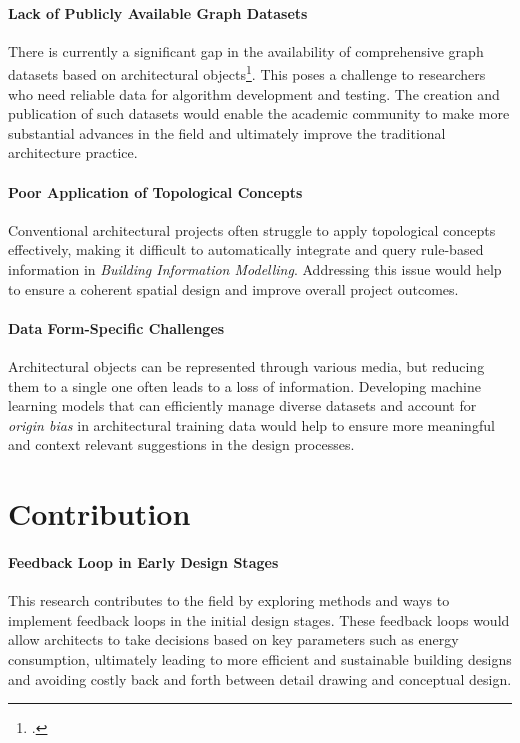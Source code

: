 \documentclass[a4paper, 12pt]{report}
\begin{document}
\paragraph{Lack of Publicly Available Graph Datasets}

There is currently a significant gap in the availability of comprehensive graph datasets based on architectural objects\footcite{alymani2022graph}. This poses a challenge to researchers who need reliable data for algorithm development and testing. The creation and publication of such datasets would enable the academic community to make more substantial advances in the field and ultimately improve the traditional architecture practice.

\paragraph{Poor Application of Topological Concepts}

Conventional architectural projects often struggle to apply topological concepts effectively, making it difficult to automatically integrate and query rule-based information in \textit{Building Information Modelling}. Addressing this issue would help to ensure a coherent spatial design and improve overall project outcomes.

\paragraph{Data Form-Specific Challenges}

Architectural objects can be represented through various media, but reducing them to a single one often leads to a loss of information. Developing machine learning models that can efficiently manage diverse datasets and account for \textit{\gls{origin bias}} in architectural training data would help to ensure more meaningful and context relevant suggestions in the design processes.

\section{Contribution}\label{sec:contribution}

\paragraph{Feedback Loop in Early Design Stages}

This research contributes to the field by exploring methods and ways to implement feedback loops in the initial design stages. These feedback loops would allow architects to take decisions based on key parameters such as energy consumption, ultimately leading to more efficient and sustainable building designs and avoiding costly back and forth between detail drawing and conceptual design.
\end{document}

